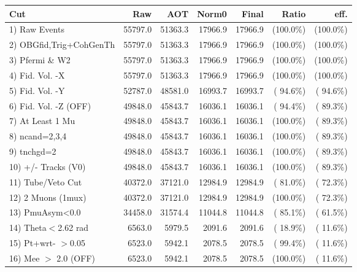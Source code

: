  \begin{table}[h!]\centering
 \begin{tabular}{||l||r|r|r|r|r|r||}
 \hline
 \hline
 Cut & Raw & AOT & Norm0 & Final & Ratio & eff.       \\
 \hline
  1) Raw Events           &      55797.0 &      51363.3 &      17966.9 &      17966.9 & (100.0\%) & (100.0\%) \\
  2) OBGfid,Trig+CohGenTh &      55797.0 &      51363.3 &      17966.9 &      17966.9 & (100.0\%) & (100.0\%) \\
  3) Pfermi \& W2         &      55797.0 &      51363.3 &      17966.9 &      17966.9 & (100.0\%) & (100.0\%) \\
  4) Fid. Vol. -X         &      55797.0 &      51363.3 &      17966.9 &      17966.9 & (100.0\%) & (100.0\%) \\
  5) Fid. Vol. -Y         &      52787.0 &      48581.0 &      16993.7 &      16993.7 & ( 94.6\%) & ( 94.6\%) \\
  6) Fid. Vol. -Z (OFF)   &      49848.0 &      45843.7 &      16036.1 &      16036.1 & ( 94.4\%) & ( 89.3\%) \\
  7) At Least 1 Mu        &      49848.0 &      45843.7 &      16036.1 &      16036.1 & (100.0\%) & ( 89.3\%) \\
  8) ncand=2,3,4          &      49848.0 &      45843.7 &      16036.1 &      16036.1 & (100.0\%) & ( 89.3\%) \\
  9) tnchgd=2             &      49848.0 &      45843.7 &      16036.1 &      16036.1 & (100.0\%) & ( 89.3\%) \\
 10) +/- Tracks (V0)      &      49848.0 &      45843.7 &      16036.1 &      16036.1 & (100.0\%) & ( 89.3\%) \\
 11) Tube/Veto Cut        &      40372.0 &      37121.0 &      12984.9 &      12984.9 & ( 81.0\%) & ( 72.3\%) \\
 12) 2 Muons (1mux)       &      40372.0 &      37121.0 &      12984.9 &      12984.9 & (100.0\%) & ( 72.3\%) \\
 13) PmuAsym<0.0          &      34458.0 &      31574.4 &      11044.8 &      11044.8 & ( 85.1\%) & ( 61.5\%) \\
 14) Theta$<$2.62 rad     &       6563.0 &       5979.5 &       2091.6 &       2091.6 & ( 18.9\%) & ( 11.6\%) \\
 15) Pt+wrt- $>$0.05      &       6523.0 &       5942.1 &       2078.5 &       2078.5 & ( 99.4\%) & ( 11.6\%) \\
 16) Mee $>$ 2.0  (OFF)   &       6523.0 &       5942.1 &       2078.5 &       2078.5 & (100.0\%) & ( 11.6\%) \\

\end{tabular}
\end{table}
